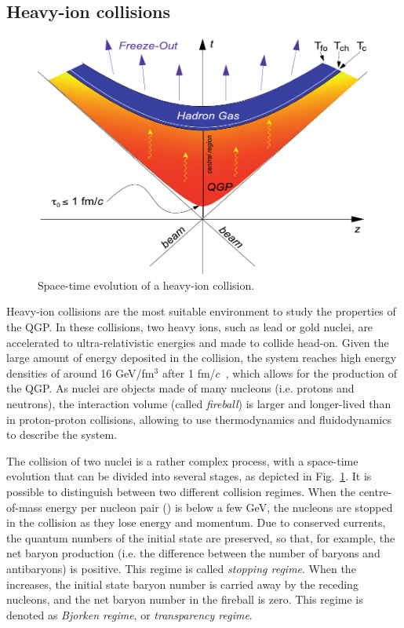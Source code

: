 \subsection{Heavy-ion collisions}
\begin{figure}[t]
  \centering
  \includegraphics[width=0.7\linewidth]{Figures/Chapter 1/Bild_18.pdf}
  \caption{Space-time evolution of a heavy-ion collision.}
  \label{fig:HeavyIonCollisions}
\end{figure}
Heavy-ion collisions are the most suitable environment to study the properties of the QGP. In these collisions, two heavy ions, such as lead or gold nuclei, are accelerated to ultra-relativistic energies and made to collide head-on. Given the large amount of energy deposited in the collision, the system reaches high energy densities of around 16 GeV/fm$^3$ after 1 fm/$c$~\cite{Loizides:2011ys}, which allows for the production of the QGP. As nuclei are objects made of many nucleons (i.e. protons and neutrons), the interaction volume (called \emph{fireball}) is larger and longer-lived than in proton-proton collisions, allowing to use thermodynamics and fluidodynamics to describe the system. 

The collision of two nuclei is a rather complex process, with a space-time evolution that can be divided into several stages, as depicted in Fig.~\ref{fig:HeavyIonCollisions}. It is possible to distinguish between two different collision regimes. When the centre-of-mass energy per nucleon pair (\snn) is below a few GeV, the nucleons are stopped in the collision as they lose energy and momentum. Due to conserved currents, the quantum numbers of the initial state are preserved, so that, for example, the net baryon production (i.e. the difference between the number of baryons and antibaryons) is positive. This regime is called \emph{stopping regime}. When the \snn increases, the initial state baryon number is carried away by the receding nucleons, and the net baryon number in the fireball is zero. This regime is denoted as \emph{Bjorken regime}, or \emph{transparency regime}. 

